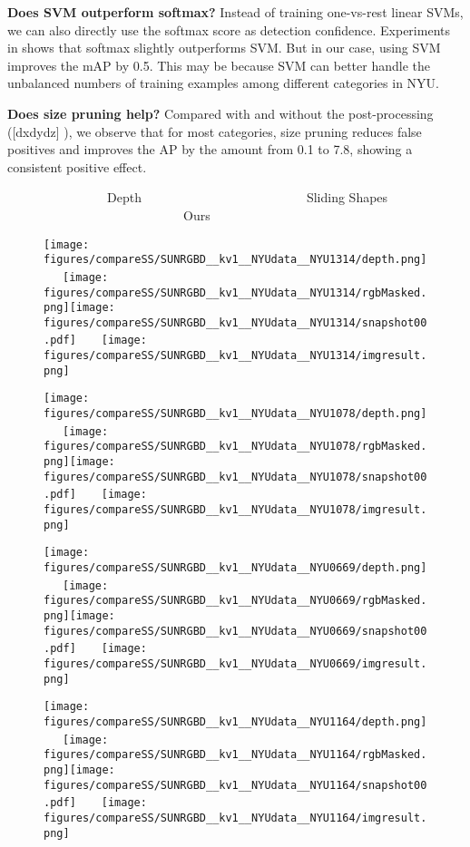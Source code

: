 \documentclass[10pt,twocolumn,letterpaper]{article}
\begin{document}
{\bf Does SVM outperform softmax?}
Instead of training one-vs-rest linear SVMs, we can also directly use the softmax score as detection confidence. Experiments in \cite{FastRCNN} shows that softmax slightly outperforms SVM. 
But in our case, using SVM improves the mAP by 0.5.
This may be because SVM can better handle the unbalanced numbers of training examples among different categories in NYU.

{\bf Does size pruning help?}
Compared with and without the post-processing ([dxdydz] ),
we observe that for most categories, size pruning reduces false positives and improves the AP by the amount from 0.1 to 7.8, showing a consistent positive effect.

\begin{figure}[t]

\vspace{-2mm}
{\footnotesize
~~~~~~~~~~Depth~~~~~~~~~~~~~~~~~~~~~~~~~~Sliding Shapes \cite{SlidingShapes} ~~~~~~~~~~~~~~~~~~~~~~Ours~~

}

\vspace{-4mm}
\begin{center}
\texttt{[image: figures/compareSS/SUNRGBD\_\_kv1\_\_NYUdata\_\_NYU1314/depth.png]}~~~\texttt{[image: figures/compareSS/SUNRGBD\_\_kv1\_\_NYUdata\_\_NYU1314/rgbMasked.png]}\texttt{[image: figures/compareSS/SUNRGBD\_\_kv1\_\_NYUdata\_\_NYU1314/snapshot00.pdf]}~~~~\texttt{[image: figures/compareSS/SUNRGBD\_\_kv1\_\_NYUdata\_\_NYU1314/imgresult.png]}

\texttt{[image: figures/compareSS/SUNRGBD\_\_kv1\_\_NYUdata\_\_NYU1078/depth.png]}~~~\texttt{[image: figures/compareSS/SUNRGBD\_\_kv1\_\_NYUdata\_\_NYU1078/rgbMasked.png]}\texttt{[image: figures/compareSS/SUNRGBD\_\_kv1\_\_NYUdata\_\_NYU1078/snapshot00.pdf]}~~~~\texttt{[image: figures/compareSS/SUNRGBD\_\_kv1\_\_NYUdata\_\_NYU1078/imgresult.png]}

\texttt{[image: figures/compareSS/SUNRGBD\_\_kv1\_\_NYUdata\_\_NYU0669/depth.png]}~~~\texttt{[image: figures/compareSS/SUNRGBD\_\_kv1\_\_NYUdata\_\_NYU0669/rgbMasked.png]}\texttt{[image: figures/compareSS/SUNRGBD\_\_kv1\_\_NYUdata\_\_NYU0669/snapshot00.pdf]}~~~~\texttt{[image: figures/compareSS/SUNRGBD\_\_kv1\_\_NYUdata\_\_NYU0669/imgresult.png]}

\texttt{[image: figures/compareSS/SUNRGBD\_\_kv1\_\_NYUdata\_\_NYU1164/depth.png]}~~~\texttt{[image: figures/compareSS/SUNRGBD\_\_kv1\_\_NYUdata\_\_NYU1164/rgbMasked.png]}\texttt{[image: figures/compareSS/SUNRGBD\_\_kv1\_\_NYUdata\_\_NYU1164/snapshot00.pdf]}~~~~\texttt{[image: figures/compareSS/SUNRGBD\_\_kv1\_\_NYUdata\_\_NYU1164/imgresult.png]}



\end{center}
\end{figure}
\end{document}
